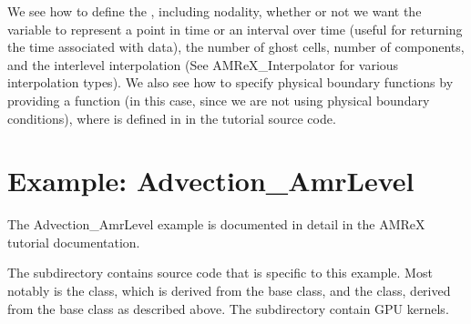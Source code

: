 \documentclass[letterpaper,10pt,english]{sphinxmanual}
\begin{document}
\begin{sphinxVerbatim}[commandchars=\\\{\}]
     
      

       
\end{sphinxVerbatim}

\sphinxAtStartPar
We see how to define the , including nodality, whether or not
we want the variable to represent a point in time or an interval over time
(useful for returning the time associated with data), the number of ghost
cells, number of components, and the interlevel interpolation (See
AMReX\_Interpolator for various interpolation types). We also see how to specify
physical boundary functions by providing a function (in this case,
 since we are not using physical boundary conditions), where
 is defined in  in the tutorial source
code.


\section{Example: Advection\_AmrLevel}
\label{\detokenize{AmrLevel:example-advection-amrlevel}}
\sphinxAtStartPar
The Advection\_AmrLevel example is documented in detail
in the AMReX tutorial documentation.

\sphinxAtStartPar
The  subdirectory contains source code that is specific to this example. Most notably is the  class, which is derived from the base
 class, and the  class, derived from the base
 class as described above. The subdirectory  contain GPU kernels.
\end{document}
